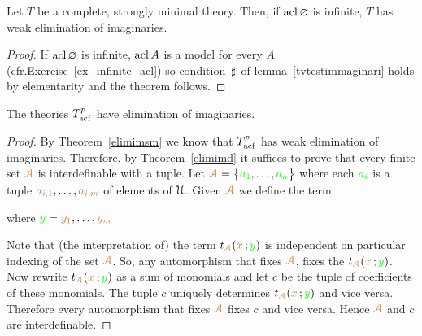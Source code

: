 \documentclass[creche.tex]{subfiles}
\begin{document}
\begin{theorem}\label{elimimsm} 
Let $T$ be a complete, strongly minimal theory.
Then, if $\mathop{\rm acl}\varnothing$ is infinite, $T$ has weak elimination of imaginaries.
\end{theorem}

\begin{proof}
If $\mathop{\rm acl}\varnothing$ is infinite, $\mathop{\rm acl} A$ is a model for every $A$ (cfr.\@ Exercise~\ref{ex_infinite_acl}) so condition $\,\sharp\,$ of lemma~\ref{tvtestimmaginari} holds by elementarity and the theorem follows.
\end{proof}


\begin{theorem}\label{elimimacf} 
The theories $T^p_{\rm acf}$ have elimination of imaginaries.
\end{theorem}

\begin{proof}
By Theorem~\ref{elimimsm} we know that $T^p_{\rm acf}$ has weak elimination of imaginaries.
Therefore, by Theorem~\ref{elimimd} it suffices to prove that every finite set ${\color{brown}\EuScript A}$ is interdefinable with a tuple.
Let ${\color{brown}\EuScript A}=\big\{{\color{green} a_1},\dots,{\color{green} a_n}\big\}$ where each ${\color{green} a_i}$ is a tuple ${\color{brown} a_{i,1}},\dots,{\color{brown} a_{i,m}}$ of elements of $\EuScript U$.
Given ${\color{brown}\EuScript A}$ we define the term

\hfill where ${\color{green} y}={\color{brown} y_1},\dots,{\color{brown} y_m}$


Note that (the interpretation of) the term $t_{\color{brown}\EuScript A}({\color{brown} x}\,;{\color{green} y})$ is independent on particular indexing of the set ${\color{brown}\EuScript A}$.
So, any automorphism that fixes ${\color{brown}\EuScript A}$, fixes the  $t_{\color{brown}\EuScript A}({\color{brown} x}\,;{\color{green} y})$.
Now rewrite $t_{\color{brown}\EuScript A}({\color{brown} x}\,;{\color{green} y})$ as a sum of monomials and let $c$ be the tuple of coefficients of these monomials.
The tuple $c$ uniquely determines $t_{\color{brown}\EuScript A}({\color{brown} x}\,;{\color{green} y})$ and vice versa.
Therefore every automorphism that fixes  ${\color{brown}\EuScript A}$ fixes  $c$ and vice versa.
Hence  ${\color{brown}\EuScript A}$ and  $c$ are interdefinable.
\end{proof}
\end{document}
